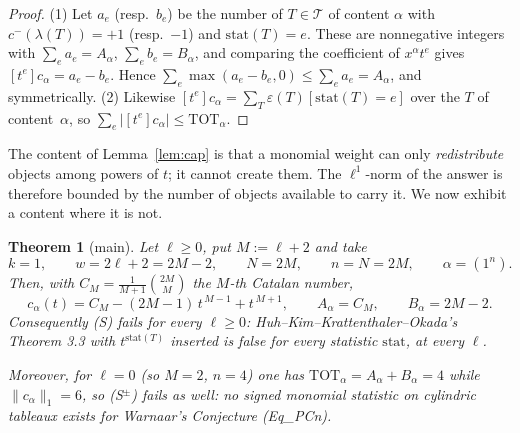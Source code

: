 \documentclass[11pt]{article}
\newtheorem{theorem}{Theorem}
\theoremstyle{definition}
\newcommand{\la}{\lambda}
\begin{document}
\begin{proof}
(1) Let $a_e$ (resp.\ $b_e$) be the number of $T\in\mathcal T$ of content
$\alpha$ with $c^-(\la(T))=+1$ (resp.\ $-1$) and $\mathrm{stat}(T)=e$. These are
nonnegative integers with $\sum_e a_e=A_\alpha$, $\sum_e b_e=B_\alpha$, and
comparing the coefficient of $x^{\alpha}t^{e}$ gives $[t^e]c_\alpha=a_e-b_e$.
Hence $\sum_e\max(a_e-b_e,0)\le\sum_e a_e=A_\alpha$, and symmetrically.
(2) Likewise $[t^e]c_\alpha=\sum_{T}\varepsilon(T)[\mathrm{stat}(T)=e]$ over the
$T$ of content~$\alpha$, so $\sum_e|[t^e]c_\alpha|\le\mathrm{TOT}_\alpha$.
\end{proof}

The content of Lemma~\ref{lem:cap} is that a monomial weight can only
\emph{redistribute} objects among powers of $t$; it cannot create them. The
$\ell^1$-norm of the answer is therefore bounded by the number of objects
available to carry it. We now exhibit a content where it is not.

\begin{theorem}[main]\label{thm:main}
Let $\ell\ge0$, put $M:=\ell+2$ and take
\[
  k=1,\qquad w=2\ell+2=2M-2,\qquad N=2M,\qquad n=N=2M,\qquad \alpha=(1^{n}).
\]
Then, with $C_M=\frac{1}{M+1}\binom{2M}{M}$ the $M$-th Catalan number,
\begin{equation}\label{eq:witness}
  c_\alpha(t)=C_M-(2M-1)\,t^{\,M-1}+t^{\,M+1},
  \qquad A_\alpha=C_M,\qquad B_\alpha=2M-2 .
\end{equation}
Consequently \textup{(S)} fails for \emph{every} $\ell\ge0$: Huh--Kim--Krattenthaler--Okada's
Theorem 3.3 with $t^{\mathrm{stat}(T)}$ inserted is false for every statistic
$\mathrm{stat}$, at every $\ell$.

Moreover, for $\ell=0$ (so $M=2$, $n=4$) one has
$\mathrm{TOT}_\alpha=A_\alpha+B_\alpha=4$ while $\|c_\alpha\|_1=6$, so
\textup{(S$^\pm$)} fails as well: no signed monomial statistic on cylindric
tableaux exists for Warnaar's Conjecture \textup{(Eq\_PCn)}.
\end{theorem}
\end{document}
